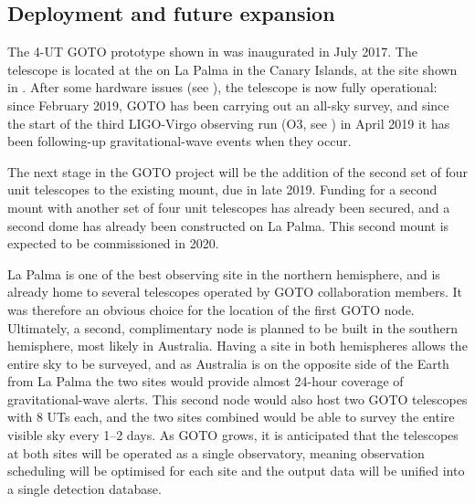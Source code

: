 
\subsection{Deployment and future expansion}
\label{sec:goto_expansion}
\begin{colsection}

The 4-UT GOTO prototype shown in  was inaugurated in July 2017. The telescope is located at the  on La Palma in the Canary Islands, at the site shown in . After some hardware issues (see ), the telescope is now fully operational: since February 2019, GOTO has been carrying out an all-sky survey, and since the start of the third LIGO-Virgo observing run (O3, see ) in April 2019 it has been following-up gravitational-wave events when they occur.

The next stage in the GOTO project will be the addition of the second set of four unit telescopes to the existing mount, due in late 2019. Funding for a second mount with another set of four unit telescopes has already been secured, and a second dome has already been constructed on La Palma. This second mount is expected to be commissioned in 2020.

La Palma is one of the best observing site in the northern hemisphere, and is already home to several telescopes operated by GOTO collaboration members. It was therefore an obvious choice for the location of the first GOTO node. Ultimately, a second, complimentary node is planned to be built in the southern hemisphere, most likely in Australia. Having a site in both hemispheres allows the entire sky to be surveyed, and as Australia is on the opposite side of the Earth from La Palma the two sites would provide almost 24-hour coverage of gravitational-wave alerts. This second node would also host two GOTO telescopes with 8 UTs each, and the two sites combined would be able to survey the entire visible sky every 1--2 days. As GOTO grows, it is anticipated that the telescopes at both sites will be operated as a single observatory, meaning observation scheduling will be optimised for each site and the output data will be unified into a single detection database.


\end{colsection}
